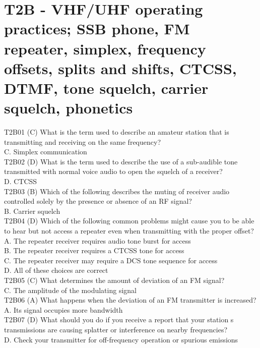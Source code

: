 \documentclass[12pt,letterpaper]{report}
\begin{document}
\section{T2B - VHF/UHF operating practices; SSB phone, FM repeater, simplex, frequency offsets, splits and shifts, CTCSS, DTMF, tone squelch, carrier squelch, phonetics}

T2B01 (C) What is the term used to describe an amateur station that is transmitting and receiving on the same frequency?\\
C. Simplex communication\\

T2B02 (D) What is the term used to describe the use of a sub-audible tone transmitted with normal voice audio to open the squelch of a receiver?\\
D. CTCSS\\

T2B03 (B) Which of the following describes the muting of receiver audio controlled solely by the presence or absence of an RF signal?\\
B. Carrier squelch\\

T2B04 (D) Which of the following common problems might cause you to be able to hear but not access a repeater even when transmitting with the proper offset?\\
A. The repeater receiver requires audio tone burst for access\\
B. The repeater receiver requires a CTCSS tone for access\\
C. The repeater receiver may require a DCS tone sequence for access\\
D. All of these choices are correct\\

T2B05 (C) What determines the amount of deviation of an FM signal?\\
C. The amplitude of the modulating signal\\

T2B06 (A) What happens when the deviation of an FM transmitter is increased?\\
A. Its signal occupies more bandwidth\\

T2B07 (D) What should you do if you receive a report that your station s transmissions are causing splatter or interference on nearby frequencies?\\
D. Check your transmitter for off-frequency operation or spurious emissions\\
\end{document}
